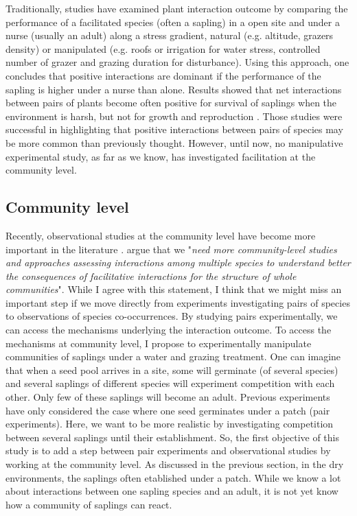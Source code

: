 \documentclass[12pt]{article} %
\begin{document}
Traditionally, studies have examined plant interaction outcome by comparing the performance of a facilitated species (often a sapling) in a open site and under a nurse (usually an adult) along a stress gradient, natural (e.g. altitude, grazers density) or manipulated (e.g. roofs or irrigation for water stress, controlled number of grazer and grazing duration for disturbance).
Using this approach, one concludes that positive interactions are dominant if the performance of the sapling is higher under a nurse than alone. Results showed that net interactions between pairs of plants become often positive for survival of saplings when the environment is harsh, but not for growth and reproduction \citep{He2013}.
Those studies were successful in highlighting that positive interactions between pairs of species may be more common than previously thought. However, until now, no manipulative experimental study, as far as we know, has investigated facilitation at the community level. 

\subsection{Community level}
Recently, observational studies at the community level have become more important in the literature \citep{Soliveres2012, Gross2013, Soliveres2014b}. %
\citet{Soliveres2014} argue that we "\textit{need more community-level studies and approaches assessing interactions among multiple species to understand better the consequences of facilitative interactions for the structure of whole communities}". 
While I agree with this statement, I think that we might miss an important step if we move directly from experiments investigating pairs of species to observations of species co-occurrences. By studying pairs experimentally, we can access the mechanisms underlying the interaction outcome. 
To access the mechanisms at community level, I propose to experimentally manipulate communities of saplings under a water and grazing treatment.
One can imagine that when a seed pool arrives in a site, some will germinate (of several species) and several saplings of different species will experiment competition with each other. Only few of these saplings will become an adult. Previous experiments have only considered the case where one seed germinates under a patch (pair experiments). Here, we want to be more realistic by investigating competition between several saplings until their establishment. So, the first objective of this study is to add a step between pair experiments and observational studies by working at the community level. As discussed in the previous section, in the dry environments, the saplings often etablished under a patch. While we know a lot about interactions between one sapling species and an adult, it is not yet know how a community of saplings can react. 
\end{document}
